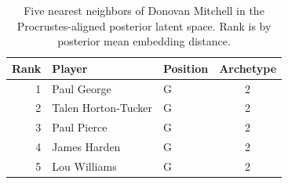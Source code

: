 \begin{table}[htbp]
  \centering\small
  \begin{tabular}{rllc}
    \toprule
    Rank & Player & Position & Archetype \\
    \midrule
    1 & Paul George & G & 2 \\
    2 & Talen Horton-Tucker & G & 2 \\
    3 & Paul Pierce & G & 2 \\
    4 & James Harden & G & 2 \\
    5 & Lou Williams & G & 2 \\
    \bottomrule
  \end{tabular}
  \caption{Five nearest neighbors of Donovan Mitchell in the Procrustes-aligned posterior latent space. Rank is by posterior mean embedding distance.}
  \label{tab:Donovan_Mitchell_neighbors}
\end{table}

